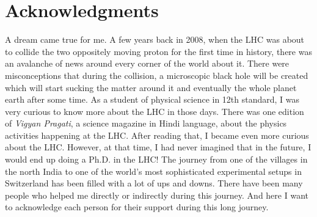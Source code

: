 \chapter{Acknowledgments}

\lettrine[lines=2, findent=3pt, nindent=0pt]{A}{} dream came true for me. A few 
years back in 2008, when the LHC was about to collide the two oppositely
moving proton for the first time in history, there was an avalanche of news
around every corner of the world about it. There were misconceptions that
during the collision, a microscopic black hole will be created which will start 
sucking the matter around it and eventually the whole planet earth after some time.
As a student of physical science in 12th standard, I was very curious to know 
more about the LHC in those days. There was one edition of \textit{Vigyan Pragati},
a science magazine in Hindi language, about the physics activities happening at the
LHC. After reading that, I became even more curious about the LHC. However, at 
that time, I had never imagined that in the future, I would end up doing a Ph.D. 
in the LHC! The journey from one of the villages in the north India to one of the world's most 
sophisticated experimental setups in Switzerland has been filled with a 
lot of ups and downs. There have been many people who helped me directly or 
indirectly during this journey. And here I want to acknowledge each person for their support during this long journey.

